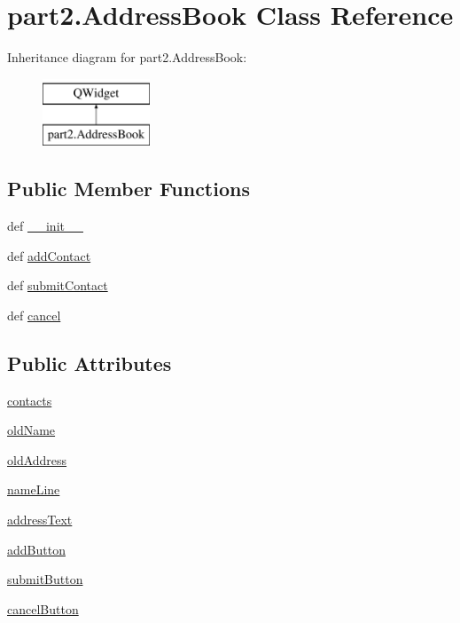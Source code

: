 \hypertarget{classpart2_1_1AddressBook}{}\section{part2.\+Address\+Book Class Reference}
\label{classpart2_1_1AddressBook}
Inheritance diagram for part2.\+Address\+Book\+:\begin{figure}[H]
\begin{center}
\leavevmode
\includegraphics[height=2.000000cm]{classpart2_1_1AddressBook}
\end{center}
\end{figure}
\subsection*{Public Member Functions}
\begin{DoxyCompactItemize}
\item 
def \hyperlink{classpart2_1_1AddressBook_ae94657cae476fe3c2867eac9da4fb857}{\+\_\+\+\_\+init\+\_\+\+\_\+}
\item 
def \hyperlink{classpart2_1_1AddressBook_a873a29f433d0ecbfff3f45fac7da74a7}{add\+Contact}
\item 
def \hyperlink{classpart2_1_1AddressBook_ac8d21c838a512ebd9767d5f06f6f2eba}{submit\+Contact}
\item 
def \hyperlink{classpart2_1_1AddressBook_a18b7a6b879c1e6f29a5f210a6ef993db}{cancel}
\end{DoxyCompactItemize}
\subsection*{Public Attributes}
\begin{DoxyCompactItemize}
\item 
\hyperlink{classpart2_1_1AddressBook_ab374d45ea613eb8902a8dd08a858f71d}{contacts}
\item 
\hyperlink{classpart2_1_1AddressBook_a4f9e21c2347f2a76820a55868c231f70}{old\+Name}
\item 
\hyperlink{classpart2_1_1AddressBook_a66ec7a1ee505e1878df07ac955a53d41}{old\+Address}
\item 
\hyperlink{classpart2_1_1AddressBook_ac30519a4b1ab88819807c73bcd055931}{name\+Line}
\item 
\hyperlink{classpart2_1_1AddressBook_af3da5be0e277b8cd7b935d9d7bf20537}{address\+Text}
\item 
\hyperlink{classpart2_1_1AddressBook_af11358e70acd1ce95ec985772cc9de78}{add\+Button}
\item 
\hyperlink{classpart2_1_1AddressBook_ac14662670e7b2d2e8e2dcb2b0481ba36}{submit\+Button}
\item 
\hyperlink{classpart2_1_1AddressBook_a008ca7ae95cd61a8201b0a43471899e2}{cancel\+Button}
\end{DoxyCompactItemize}



